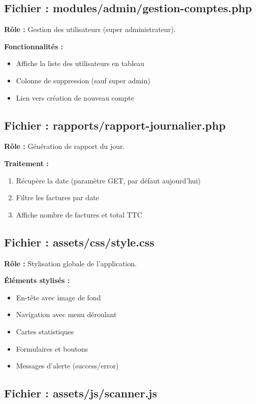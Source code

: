 \documentclass[12pt,a4paper]{report}
\begin{document}
\subsection{Fichier : modules/admin/gestion-comptes.php}

\textbf{Rôle :} Gestion des utilisateurs (super administrateur).

\textbf{Fonctionnalités :}
\begin{itemize}
    \item Affiche la liste des utilisateurs en tableau
    \item Colonne de suppression (sauf super admin)
    \item Lien vers création de nouveau compte
\end{itemize}

\subsection{Fichier : rapports/rapport-journalier.php}

\textbf{Rôle :} Génération de rapport du jour.

\textbf{Traitement :}
\begin{enumerate}
    \item Récupère la date (paramètre GET, par défaut aujourd'hui)
    \item Filtre les factures par date
    \item Affiche nombre de factures et total TTC
\end{enumerate}

\subsection{Fichier : assets/css/style.css}

\textbf{Rôle :} Stylisation globale de l'application.

\textbf{Éléments stylisés :}
\begin{itemize}
    \item En-tête avec image de fond
    \item Navigation avec menu déroulant
    \item Cartes statistiques
    \item Formulaires et boutons
    \item Messages d'alerte (success/error)
\end{itemize}

\subsection{Fichier : assets/js/scanner.js}
\end{document}
